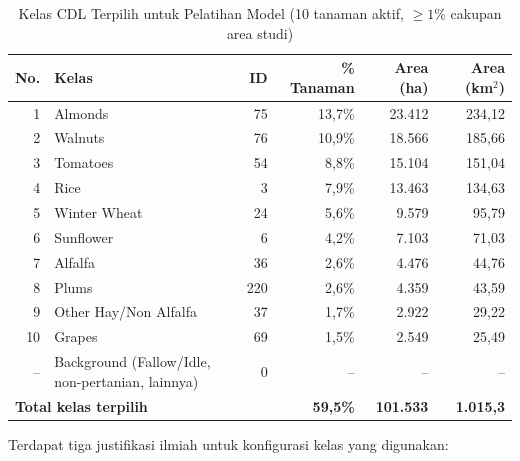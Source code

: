 \begin{table}[htbp]
\centering
\caption{Kelas CDL Terpilih untuk Pelatihan Model (10 tanaman aktif, $\geq 1\%$ cakupan area studi)}
\label{tab:selected_classes}
\begin{tabularx}{\textwidth}{r X r r r r}
\hline
\textbf{No.} & \textbf{Kelas} & \textbf{ID} & \textbf{\% Tanaman} & \textbf{Area (ha)} & \textbf{Area (km$^2$)} \\
\hline
1  & Almonds               & 75  & 13,7\% & 23.412 & 234,12 \\
2  & Walnuts               & 76  & 10,9\% & 18.566 & 185,66 \\
3  & Tomatoes              & 54  &  8,8\% & 15.104 & 151,04 \\
4  & Rice                  & 3   &  7,9\% & 13.463 & 134,63 \\
5  & Winter Wheat          & 24  &  5,6\% &  9.579 &  95,79 \\
6  & Sunflower             & 6   &  4,2\% &  7.103 &  71,03 \\
7  & Alfalfa               & 36  &  2,6\% &  4.476 &  44,76 \\
8  & Plums                 & 220 &  2,6\% &  4.359 &  43,59 \\
9  & Other Hay/Non Alfalfa & 37  &  1,7\% &  2.922 &  29,22 \\
10 & Grapes                & 69  &  1,5\% &  2.549 &  25,49 \\
-- & Background (Fallow/Idle, non-pertanian, lainnya) & 0 & -- & -- & -- \\
\hline
\multicolumn{3}{l}{\textbf{Total kelas terpilih}} & \textbf{59,5\%} & \textbf{101.533} & \textbf{1.015,3} \\
\hline
\end{tabularx}
\end{table}

Terdapat tiga justifikasi ilmiah untuk konfigurasi kelas yang digunakan:


